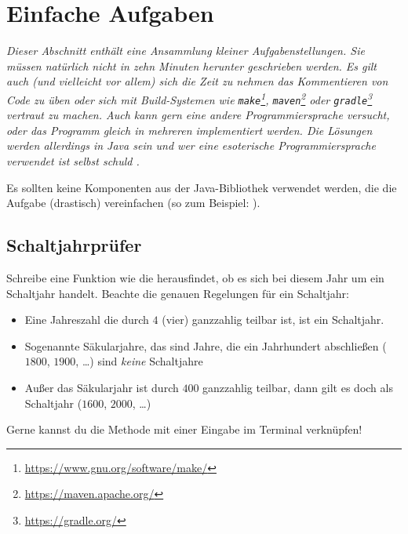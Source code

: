 \documentclass[table]{sopra-base}
\let\T\texttt
\begin{document}
\section{Einfache Aufgaben}

\textit{Dieser Abschnitt enthält eine Ansammlung kleiner Aufgabenstellungen. Sie müssen natürlich nicht in zehn Minuten herunter geschrieben werden. Es gilt auch (und vielleicht vor allem) sich die Zeit zu nehmen das
Kommentieren von Code zu üben oder sich mit Build-Systemen wie \T{make}\footnote{\url{https://www.gnu.org/software/make/}}, \T{maven}\footnote{\url{https://maven.apache.org/}} oder \T{gradle}\footnote{\url{https://gradle.org/}} vertraut zu machen. Auch kann gern eine andere Programmiersprache versucht, oder das Programm gleich in mehreren implementiert werden. Die Lösungen werden allerdings in Java sein und wer eine esoterische Programmiersprache verwendet ist selbst schuld \Winkey.}\par{}

Es sollten keine Komponenten aus der Java-Bibliothek verwendet werden, die die Aufgabe (drastisch) vereinfachen (so zum Beispiel: ). 

\subsection{Schaltjahrprüfer}

\label{sec:leapyear}Schreibe eine Funktion wie  die herausfindet, ob es sich bei diesem Jahr um ein Schaltjahr handelt. Beachte die genauen Regelungen für ein Schaltjahr: \begin{itemize}[nolistsep]
    \item Eine Jahreszahl die durch $4$ (vier) ganzzahlig teilbar ist, ist ein Schaltjahr.
    \item Sogenannte Säkularjahre, das sind Jahre, die ein Jahrhundert abschließen ($1800$, $1900$, \ldots) sind \emph{keine} Schaltjahre
    \item Außer das Säkularjahr ist durch $400$ ganzzahlig teilbar, dann gilt es doch als Schaltjahr ($1600$, $2000$, \ldots)
\end{itemize}
Gerne kannst du die Methode mit einer Eingabe im Terminal verknüpfen!
\end{document}
